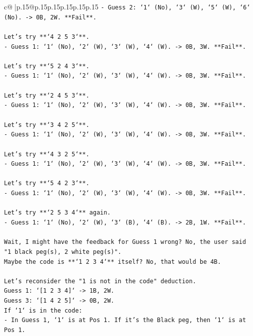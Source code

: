 \documentclass{article}
\begin{document}
{\begin{supertabular}{c@{$\;$}|p{.15\linewidth}@{}p{.15\linewidth}p{.15\linewidth}p{.15\linewidth}p{.15\linewidth}p{.15\linewidth}}
{{{\texttt{{-}   Guess 2: `1` (No), `3` (W), `5` (W), `6` (No). {-}> 0B, 2W. **Fail**.} \\
\\ 
\texttt{Let's try **`4 2 5 3`**.} \\
\texttt{{-}   Guess 1: `1` (No), `2` (W), `3` (W), `4` (W). {-}> 0B, 3W. **Fail**.} \\
\\ 
\texttt{Let's try **`5 2 4 3`**.} \\
\texttt{{-}   Guess 1: `1` (No), `2` (W), `3` (W), `4` (W). {-}> 0B, 3W. **Fail**.} \\
\\ 
\texttt{Let's try **`2 4 5 3`**.} \\
\texttt{{-}   Guess 1: `1` (No), `2` (W), `3` (W), `4` (W). {-}> 0B, 3W. **Fail**.} \\
\\ 
\texttt{Let's try **`3 4 2 5`**.} \\
\texttt{{-}   Guess 1: `1` (No), `2` (W), `3` (W), `4` (W). {-}> 0B, 3W. **Fail**.} \\
\\ 
\texttt{Let's try **`4 3 2 5`**.} \\
\texttt{{-}   Guess 1: `1` (No), `2` (W), `3` (W), `4` (W). {-}> 0B, 3W. **Fail**.} \\
\\ 
\texttt{Let's try **`5 4 2 3`**.} \\
\texttt{{-}   Guess 1: `1` (No), `2` (W), `3` (W), `4` (W). {-}> 0B, 3W. **Fail**.} \\
\\ 
\texttt{Let's try **`2 5 3 4`** again.} \\
\texttt{{-}   Guess 1: `1` (No), `2` (W), `3` (B), `4` (B). {-}> 2B, 1W. **Fail**.} \\
\\ 
\texttt{Wait, I might have the feedback for Guess 1 wrong? No, the user said "1 black peg(s), 2 white peg(s)".} \\
\texttt{Maybe the code is **`1 2 3 4`** itself? No, that would be 4B.} \\
\\ 
\texttt{Let's reconsider the "1 is not in the code" deduction.} \\
\texttt{Guess 1: `{[}1 2 3 4{]}` {-}> 1B, 2W.} \\
\texttt{Guess 3: `{[}1 4 2 5{]}` {-}> 0B, 2W.} \\
\texttt{If `1` is in the code:} \\
\texttt{{-}   In Guess 1, `1` is at Pos 1. If it's the Black peg, then `1` is at Pos 1.} \\
}}}
\end{supertabular}}
\end{document}
